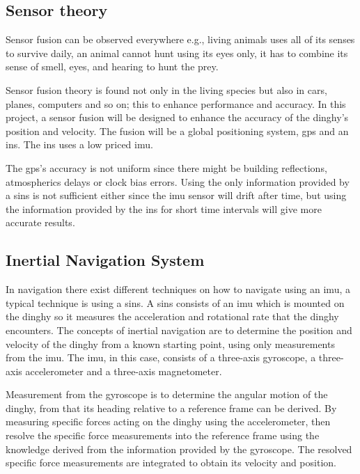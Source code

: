 \subsection{Sensor theory}
Sensor fusion can be observed everywhere e.g., living animals uses all of its senses to survive daily, an animal cannot hunt using its eyes only, it has to combine its sense of smell, eyes, and hearing to hunt the prey\cite{animal}.

Sensor fusion theory is found not only in the living species but also in cars, planes, computers and so on; this to enhance performance and accuracy. In this project, a sensor fusion will be designed to enhance the accuracy of the dinghy's position and velocity. The fusion will be a global positioning system,  \gls{gps} and an \gls{ins}. The \gls{ins} uses a low priced \gls{imu}.

The \gls{gps}'s accuracy is not uniform since there might be building reflections, atmospherics delays or clock bias errors\cite{boken}. Using the only information provided by a \gls{sins} is not sufficient either since the \gls{imu} sensor will drift after time, but using the information provided by the \gls{ins} for short time intervals will give more accurate results.  

\subsection{Inertial Navigation System}
In navigation there exist different techniques on how to navigate using an \gls{imu}, a typical technique is using a \gls{sins}. A \gls{sins} consists of an \gls{imu} which is mounted on the dinghy so it measures the acceleration and rotational rate that the dinghy encounters.
The concepts of inertial navigation are to determine the position and velocity of the dinghy from a known starting point, using only measurements from the \gls{imu}. The \gls{imu}, in this case, consists of a three-axis gyroscope, a three-axis accelerometer and a three-axis magnetometer.

Measurement from the gyroscope is to determine the angular motion of the dinghy, from that its heading relative to a reference frame can be derived.
By measuring specific forces acting on the dinghy using the accelerometer, then resolve the specific force measurements into the reference frame using the knowledge derived from the information provided by the gyroscope. 
The resolved specific force measurements are integrated to obtain its velocity and position\cite{non-linear}.


